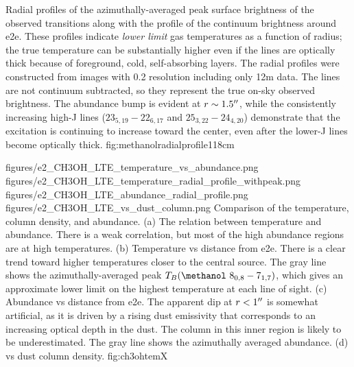 \documentclass[twocolumn]{aastex61}
\begin{document}
{Radial profiles of the azimuthally-averaged peak surface brightness of the
observed \methanol transitions along with the profile of the continuum
brightness around e2e.  These profiles indicate \emph{lower limit} gas temperatures
as a function of radius; the true temperature can be substantially higher even
if the lines are optically thick because of foreground, cold, self-absorbing
layers.
The radial profiles were constructed from images with 0.2\arcsec
resolution including only 12m data.  The lines are not continuum subtracted, so
they represent the true on-sky observed brightness.  The abundance bump is
evident at $r\sim1.5\mbox{$^{\prime\prime}$}$, while the consistently increasing high-J lines
(\methanol $23_{5,19}-22_{6,17}$ and $25_{3,22}-24_{4,20}$) demonstrate that
the excitation is continuing to increase toward the center, even after the
lower-J lines become optically thick.
}
{fig:methanolradialprofile}{1}{18cm}

\FigureFour
{figures/e2_CH3OH_LTE_temperature_vs_abundance.png}
{figures/e2_CH3OH_LTE_temperature_radial_profile_withpeak.png}
{figures/e2_CH3OH_LTE_abundance_radial_profile.png}
{figures/e2_CH3OH_LTE_vs_dust_column.png}
{Comparison of the \methanol temperature, column density, and abundance.
(a) The relation between temperature and abundance.  There is a weak correlation,
but most of the high abundance regions are at high temperatures.
(b) Temperature vs distance from e2e.  There is a clear trend toward higher
temperatures closer  to the central source.
The gray line shows the azimuthally-averaged peak $T_B(\methanol~
8_{0,8}-7_{1,7})$, which gives an approximate lower limit on the highest
temperature at each line of sight.
(c) Abundance vs distance from e2e.  The apparent dip at $r<1\mbox{$^{\prime\prime}$}$ is
somewhat artificial, as it is driven by a rising dust emissivity that
corresponds to an increasing optical depth in the dust.  The \methanol column
in this inner region is likely to be underestimated.   The gray
line shows the azimuthally averaged abundance.
(d) \methanol vs dust column density.  }
{fig:ch3ohtemX}
\end{document}
